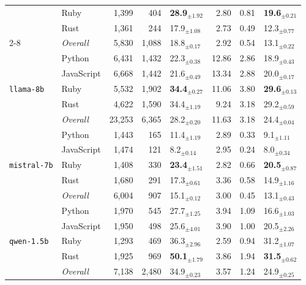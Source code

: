 \begin{longtable}{@{}llrrp{0.72cm}rrp{0.72cm}@{}}
       & Ruby & 1,399 & 404 & \textbf{28.9$_{\pm 1.92}$} & 2.80 & 0.81 & \textbf{19.6$_{\pm 0.21}$} \\
       & Rust & 1,361 & 244 & 17.9$_{\pm 1.08}$ & 2.73 & 0.49 & 12.3$_{\pm 0.77}$ \\ \cmidrule(lr){2-8}
      & \textit{Overall} & 5,830 & 1,088 & 18.8$_{\pm 0.17}$ & 2.92 & 0.54 & 13.1$_{\pm 0.22}$ \\
    \midrule
      \multirow{5}{*}{\texttt{llama-8b}} & Python & 6,431 & 1,432 & 22.3$_{\pm 0.38}$ & 12.86 & 2.86 & 18.9$_{\pm 0.43}$ \\
       & JavaScript & 6,668 & 1,442 & 21.6$_{\pm 0.49}$ & 13.34 & 2.88 & 20.0$_{\pm 0.17}$ \\
       & Ruby & 5,532 & 1,902 & \textbf{34.4$_{\pm 0.27}$} & 11.06 & 3.80 & \textbf{29.6$_{\pm 0.13}$} \\
       & Rust & 4,622 & 1,590 & 34.4$_{\pm 1.19}$ & 9.24 & 3.18 & 29.2$_{\pm 0.59}$ \\ \cmidrule(lr){2-8}
      & \textit{Overall} & 23,253 & 6,365 & 28.2$_{\pm 0.20}$ & 11.63 & 3.18 & 24.4$_{\pm 0.04}$ \\
    \midrule
      \multirow{5}{*}{\texttt{mistral-7b}} & Python & 1,443 & 165 & 11.4$_{\pm 1.19}$ & 2.89 & 0.33 & 9.1$_{\pm 1.11}$ \\
       & JavaScript & 1,474 & 121 & 8.2$_{\pm 0.14}$ & 2.95 & 0.24 & 8.0$_{\pm 0.34}$ \\
       & Ruby & 1,408 & 330 & \textbf{23.4$_{\pm 1.51}$} & 2.82 & 0.66 & \textbf{20.5$_{\pm 0.87}$} \\
       & Rust & 1,680 & 291 & 17.3$_{\pm 0.61}$ & 3.36 & 0.58 & 14.9$_{\pm 1.16}$ \\ \cmidrule(lr){2-8}
      & \textit{Overall} & 6,004 & 907 & 15.1$_{\pm 0.12}$ & 3.00 & 0.45 & 13.1$_{\pm 0.43}$ \\
    \midrule
      \multirow{5}{*}{\texttt{qwen-1.5b}} & Python & 1,970 & 545 & 27.7$_{\pm 1.25}$ & 3.94 & 1.09 & 16.6$_{\pm 1.03}$ \\
       & JavaScript & 1,950 & 498 & 25.6$_{\pm 4.01}$ & 3.90 & 1.00 & 20.5$_{\pm 2.26}$ \\
       & Ruby & 1,293 & 469 & 36.3$_{\pm 2.96}$ & 2.59 & 0.94 & 31.2$_{\pm 1.07}$ \\
       & Rust & 1,925 & 969 & \textbf{50.1$_{\pm 1.79}$} & 3.86 & 1.94 & \textbf{31.5$_{\pm 0.62}$} \\ \cmidrule(lr){2-8}
      & \textit{Overall} & 7,138 & 2,480 & 34.9$_{\pm 0.23}$ & 3.57 & 1.24 & 24.9$_{\pm 0.25}$ \\

\end{longtable}
